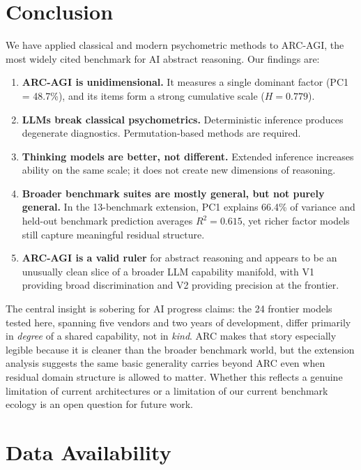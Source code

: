 \documentclass[11pt, letterpaper]{article}
\begin{document}
\section{Conclusion}
\label{sec:conclusion}

We have applied classical and modern psychometric methods to ARC-AGI, the most widely cited benchmark for AI abstract reasoning. Our findings are:

\begin{enumerate}
    \item \textbf{ARC-AGI is unidimensional.} It measures a single dominant factor (PC1 = 48.7\%), and its items form a strong cumulative scale ($H = 0.779$).
    \item \textbf{LLMs break classical psychometrics.} Deterministic inference produces degenerate diagnostics. Permutation-based methods are required.
    \item \textbf{Thinking models are better, not different.} Extended inference increases ability on the same scale; it does not create new dimensions of reasoning.
    \item \textbf{Broader benchmark suites are mostly general, but not purely general.} In the 13-benchmark extension, PC1 explains 66.4\% of variance and held-out benchmark prediction averages $R^2 = 0.615$, yet richer factor models still capture meaningful residual structure.
    \item \textbf{ARC-AGI is a valid ruler} for abstract reasoning and appears to be an unusually clean slice of a broader LLM capability manifold, with V1 providing broad discrimination and V2 providing precision at the frontier.
\end{enumerate}

The central insight is sobering for AI progress claims: the 24 frontier models tested here, spanning five vendors and two years of development, differ primarily in \textit{degree} of a shared capability, not in \textit{kind}. ARC makes that story especially legible because it is cleaner than the broader benchmark world, but the extension analysis suggests the same basic generality carries beyond ARC even when residual domain structure is allowed to matter. Whether this reflects a genuine limitation of current architectures or a limitation of our current benchmark ecology is an open question for future work.

\section*{Data Availability}
\label{sec:data}
\end{document}

